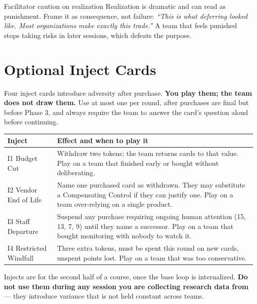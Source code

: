 \documentclass[11pt,letterpaper]{article}
\newcommand{\say}[1]{\textit{``#1''}}
\begin{document}
\begin{intervene}{Facilitator caution on realization}
Realization is dramatic and can read as punishment. Frame it as consequence, not
failure: \say{This is what deferring looked like. Most organizations make
exactly this trade.} A team that feels punished stops taking risks in later
sessions, which defeats the purpose.
\end{intervene}

\section{Optional Inject Cards}

Four inject cards introduce adversity after purchase. \textbf{You play them; the
team does not draw them.} Use at most one per round, after purchases are final
but before Phase 3, and always require the team to answer the card's question
aloud before continuing.

\begin{center}
\small
\begin{tabularx}{\textwidth}{@{}l X@{}}
\toprule
\textbf{Inject} & \textbf{Effect and when to play it} \\
\midrule
I1 Budget Cut & Withdraw two tokens; the team returns cards to that value. Play
on a team that finished early or bought without deliberating. \\
I2 Vendor End of Life & Name one purchased card as withdrawn. They may
substitute a Compensating Control if they can justify one. Play on a team
over-relying on a single product. \\
I3 Staff Departure & Suspend any purchase requiring ongoing human attention
(15, 13, 7, 9) until they name a successor. Play on a team that bought
monitoring with nobody to watch it. \\
I4 Restricted Windfall & Three extra tokens, must be spent this round on new
cards, unspent points lost. Play on a team that was too conservative. \\
\bottomrule
\end{tabularx}
\end{center}

Injects are for the second half of a course, once the base loop is internalized.
\textbf{Do not use them during any session you are collecting research data
from} --- they introduce variance that is not held constant across teams.


\end{document}
